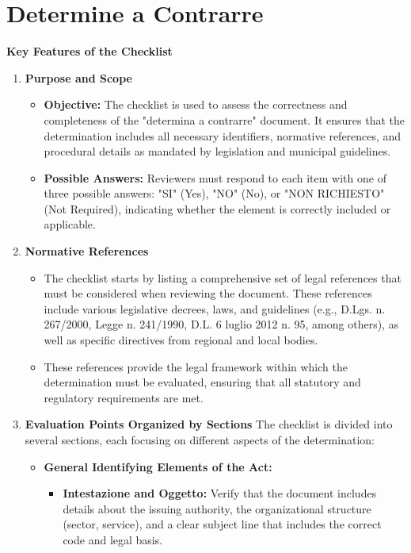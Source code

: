 \documentclass[../main.tex]{subfiles}
\begin{document}
\section*{Determine a Contrarre}

\textbf{Key Features of the Checklist }
\begin{enumerate}
    \item \textbf{Purpose and Scope}
    \begin{itemize}
        \item \textbf{Objective:} The checklist is used to assess the correctness and completeness of the "determina a contrarre" document. It ensures that the determination includes all necessary identifiers, normative references, and procedural details as mandated by legislation and municipal guidelines.
        \item \textbf{Possible Answers:} Reviewers must respond to each item with one of three possible answers: "SI" (Yes), "NO" (No), or "NON RICHIESTO" (Not Required), indicating whether the element is correctly included or applicable.
    \end{itemize}
    \item \textbf{Normative References}
    \begin{itemize}
        \item The checklist starts by listing a comprehensive set of legal references that must be considered when reviewing the document. These references include various legislative decrees, laws, and guidelines (e.g., D.Lgs. n. 267/2000, Legge n. 241/1990, D.L. 6 luglio 2012 n. 95, among others), as well as specific directives from regional and local bodies.
        \item These references provide the legal framework within which the determination must be evaluated, ensuring that all statutory and regulatory requirements are met.
    \end{itemize}
    \item \textbf{Evaluation Points Organized by Sections}
 The checklist is divided into several sections, each focusing on different aspects of the determination:
    \begin{itemize}
        \item \textbf{General Identifying Elements of the Act:}
        \begin{itemize}
            \item \textbf{Intestazione and Oggetto:} Verify that the document includes details about the issuing authority, the organizational structure (sector, service), and a clear subject line that includes the correct code and legal basis.

\end{itemize}
\end{itemize}
\end{enumerate}
\end{document}
